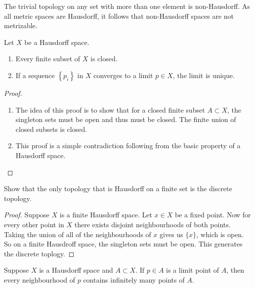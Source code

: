 \begin{example}[]
	The trivial topology on any set with more than one element is non-Hausdorff.
	As all metric spaces are Hausdorff, it follows that non-Hausdorff spaces are
	not metrizable.
\end{example}

\begin{proposition}[]
	Let $X$ be a Hausdorff space.
	\begin{enumerate}
		\item Every finite subset of $X$ is closed.
		\item If a sequence $ \left\{ p_i \right\} $ in $X$
			converges to a limit $p \in X$, the limit is unique.
	\end{enumerate}
\end{proposition}

\begin{proof}
	\hfill
	\begin{enumerate}
		\item The idea of this proof is to show that for a closed finite subset
			$A \subset X$, the singleton sets must be open and thus must be
			closed. The finite union of closed subsets is closed.

		\item This proof is a simple contradiction following from the basic
			property of a Hausdorff space.
	\end{enumerate}
\end{proof}

\begin{problem}
	Show that the only topology that is Hausdorff on a finite set is the discrete
	topology.
\end{problem}

\begin{proof}
	Suppose $X$ is a finite Hausdorff space.
	Let $x \in X$ be a fixed point.
	Now for every other point in $X$ there exists disjoint
	neighbourhoods of both points.
	Taking the union of all of the neighbourhoods of $x$
	gives us $\{x\}$, which is open.
	So on a finite Hausdroff space, the singleton sets must be open.
	This generates the discrete toplogy.
\end{proof}

\begin{proposition}[]
	Suppose $X$ is a Hausdorff space and $A \subset X$.
	If $p \in A$ is a limit point of $A$, 
	then every neighbourhood of $p$ contains infinitely many points of $A$.
\end{proposition}

